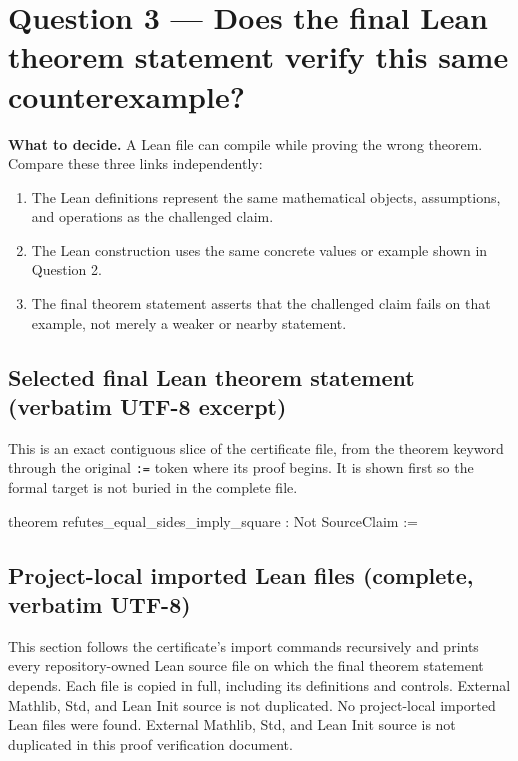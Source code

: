\documentclass[11pt]{article}
\begin{document}
\section*{Question 3 --- Does the final Lean theorem statement verify this same counterexample?}
\textbf{What to decide.} A Lean file can compile while proving the wrong theorem. Compare these three links independently:
\begin{enumerate}
\item The Lean definitions represent the same mathematical objects, assumptions, and operations as the challenged claim.
\item The Lean construction uses the same concrete values or example shown in Question 2.
\item The final theorem statement asserts that the challenged claim fails on that example, not merely a weaker or nearby statement.
\end{enumerate}
\subsection*{Selected final Lean theorem statement (verbatim UTF-8 excerpt)}
This is an exact contiguous slice of the certificate file, from the theorem keyword through the original \texttt{:=} token where its proof begins. It is shown first so the formal target is not buried in the complete file.
\begin{Vlean}
theorem refutes_equal_sides_imply_square : Not SourceClaim :=
\end{Vlean}
\subsection*{Project-local imported Lean files (complete, verbatim UTF-8)}
This section follows the certificate's import commands recursively and prints every repository-owned Lean source file on which the final theorem statement depends. Each file is copied in full, including its definitions and controls. External Mathlib, Std, and Lean Init source is not duplicated.
No project-local imported Lean files were found. External Mathlib, Std, and Lean Init source is not duplicated in this proof verification document.
\end{document}
